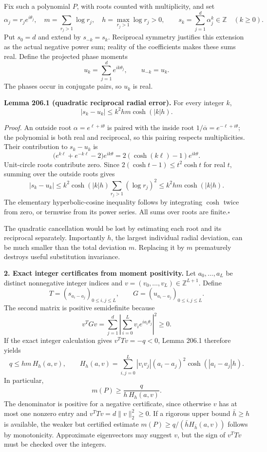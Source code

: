 \documentclass[11pt,a4paper]{article}
\newcommand{\Z}{\mathbb{Z}}
\begin{document}
Fix such a polynomial $P$, with roots counted with multiplicity, and set
\[
 \alpha_j=r_je^{i\theta_j},\quad
 m=\sum_{r_j>1}\log r_j,\quad
 h=\max_{r_j>1}\log r_j>0,
 \qquad
 s_k=\sum_{j=1}^d\alpha_j^k\in\Z\quad(k\ge0).
\]
Put $s_0=d$ and extend by $s_{-k}=s_k$. Reciprocal symmetry justifies
this extension as the actual negative power sum; reality of the
coefficients makes these sums real. Define the projected phase moments
\[
 u_k=\sum_{j=1}^de^{ik\theta_j},\qquad u_{-k}=u_k.
\]
The phases occur in conjugate pairs, so $u_k$ is real.

\textbf{Lemma 206.1 (quadratic reciprocal radial error).}
For every integer $k$,
\[
 |s_k-u_k|\le k^2 h m\cosh(|k|h). \tag{206.1}
\]

\emph{Proof.}
An outside root $\alpha=e^{\ell+i\theta}$ is paired with the inside
root $1/\overline\alpha=e^{-\ell+i\theta}$; the polynomial is both
real and reciprocal, so this pairing respects multiplicities. Their
contribution to $s_k-u_k$ is
\[
 \bigl(e^{k\ell}+e^{-k\ell}-2\bigr)e^{ik\theta}
 =2(\cosh(k\ell)-1)e^{ik\theta}.
\]
Unit-circle roots contribute zero. Since
$2(\cosh t-1)\le t^2\cosh t$ for real $t$, summing over the outside
roots gives
\[
 |s_k-u_k|
 \le k^2\cosh(|k|h)\sum_{r_j>1}(\log r_j)^2
 \le k^2hm\cosh(|k|h).
\]
The elementary hyperbolic-cosine inequality follows by integrating
$\cosh$ twice from zero, or termwise from its power series. All sums
over roots are finite.\hfill$\square$

The quadratic cancellation would be lost by estimating each root and
its reciprocal separately. Importantly $h$, the largest individual
radial deviation, can be much smaller than the total deviation $m$.
Replacing it by $m$ prematurely destroys useful substitution invariance.

\textbf{2. Exact integer certificates from moment positivity.}
Let $a_0,\ldots,a_L$ be distinct nonnegative integer indices and
$v=(v_0,\ldots,v_L)\in\Z^{L+1}$. Define
\[
 T=(s_{a_i-a_j})_{0\le i,j\le L},\qquad
 G=(u_{a_i-a_j})_{0\le i,j\le L}.
\]
The second matrix is positive semidefinite because
\[
 v^T Gv=\sum_{j=1}^d
 \left|\sum_{i=0}^L v_i e^{ia_i\theta_j}\right|^2\ge0.
\]
If the exact integer calculation gives $v^TTv=-q<0$, Lemma 206.1
therefore yields
\[
 q\le hm\,H_h(a,v),\qquad
 H_h(a,v)=\sum_{i,j=0}^L|v_iv_j|(a_i-a_j)^2
                   \cosh(|a_i-a_j|h).
\]
In particular,
\[
 \boxed{\displaystyle m(P)\ge\frac{q}{h\,H_h(a,v)}.}
 \tag{206.2}
\]
The denominator is positive for a negative certificate, since otherwise
$v$ has at most one nonzero entry and $v^TTv=d\|v\|_2^2\ge0$.
If a rigorous upper bound $\bar h\ge h$ is available, the weaker but
certified estimate $m(P)\ge q/(\bar h H_{\bar h}(a,v))$ follows by
monotonicity. Approximate eigenvectors may suggest $v$, but the sign of
$v^TTv$ must be checked over the integers.
\end{document}
